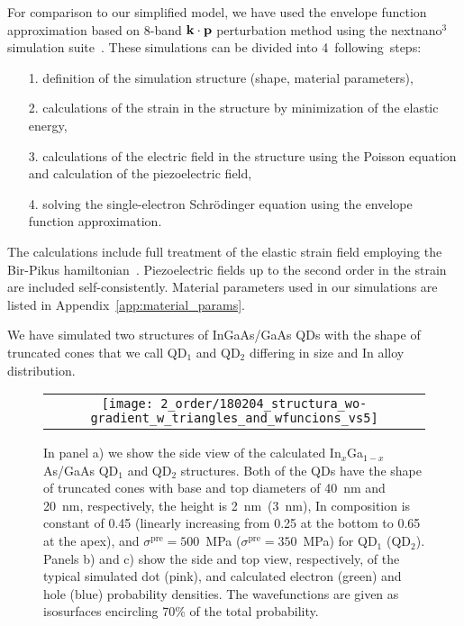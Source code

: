 For comparison to our simplified model, we have used the envelope function approximation based on 8-band ${\bf k}\cdot{\bf p}$ perturbation method using the nextnano$^3$ simulation suite~\cite{Birner:07}. These simulations can be divided into 4~following~steps:
\begin{itemize}
	\item [1.] definition of the simulation structure (shape, material parameters),
	\item[2.] calculations of the strain in the structure by minimization of the elastic energy,
	\item[3.] calculations of the electric field in the structure using the Poisson equation and calculation of the piezoelectric field,
	\item[4.] solving the single-electron Schrödinger equation using the envelope function approximation.
\end{itemize}
%
The calculations include full treatment of the elastic strain field employing the Bir-Pikus hamiltonian~\cite{BirPik}. Piezoelectric fields up to the second order in the strain are included self-consistently. Material parameters used in our simulations are listed in Appendix~\ref{app:material_params}. 





We have simulated two structures of InGaAs/GaAs QDs with the shape of truncated cones that we call QD$_1$ and QD$_2$ differing in size and In alloy distribution.
%
\begin{figure}[!ht]
	\renewcommand{\tabcolsep}{2pt}
	\begin{center}
		\begin{tabular}{c}
			\texttt{[image: 2\_order/180204\_structura\_wo-gradient\_w\_triangles\_and\_wfuncions\_vs5]} \\ 
		\end{tabular}
	\end{center}
	\caption{In panel a) we show the side view of the calculated In$_{{x}}$Ga$_{1-x}$As/GaAs QD$_1$ and QD$_2$ structures. Both of the QDs have the shape of truncated cones with base and top diameters of 40~nm and 20~nm, respectively, the height is 2~nm~(3~nm), In composition is constant of 0.45 (linearly increasing from 0.25 at the bottom to 0.65 at the apex), and $\sigma^\text{pre}=500$~MPa ($\sigma^\text{pre}=350$~MPa) for QD$_1$ (QD$_2$). Panels b) and c) show the side and top view, respectively, of the typical simulated dot (pink), and calculated electron (green) and hole (blue) probability densities. The wavefunctions are given as isosurfaces encircling 70\% of the total probability.
		\label{fig:2order:QDStruct}}
\end{figure}

